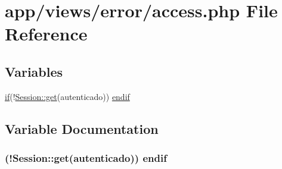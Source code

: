 \hypertarget{access_8php}{}\section{app/views/error/access.php File Reference}
\label{access_8php}
\subsection*{Variables}
\begin{DoxyCompactItemize}
\item 
\hyperlink{app_2views_2index_2index_8php_a3d726968fd3dc3d64cac837a26187799}{if}(!\hyperlink{class_session_a5b48fff21f9141b53ba79506b6b4375e}{Session\+::get}(\textquotesingle{}autenticado\textquotesingle{})) \hyperlink{access_8php_a1ce151d87fe799040523d738b7a20af3}{endif}
\end{DoxyCompactItemize}


\subsection{Variable Documentation}
\hypertarget{access_8php_a1ce151d87fe799040523d738b7a20af3}{}
\subsubsection[{endif}]{ (!{\bf Session\+::get}(\textquotesingle{}autenticado\textquotesingle{})) endif}\label{access_8php_a1ce151d87fe799040523d738b7a20af3}
